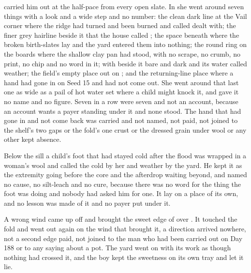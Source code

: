  carried him out at the half-pace from every open slate. In  she went around seven things with a look and a wide step and no number: the clean dark line at the Vail corner where the ridge had turned and been burned and called dealt with; the finer grey hairline beside it that the house called ; the space beneath  where the broken birth-slates lay and the yard entered them into nothing; the round ring on the boards where the shallow clay pan had stood, with no scrape, no crumb, no print, no chip and no word in it;  with  beside it bare and dark and its water called weather; the field's empty place out on ; and the returning-line place where a hand had gone in on Seed 15 and had not come out. She went around that last one as wide as a pail of hot water set where a child might knock it, and gave it no name and no figure. Seven in a row were seven and not an account, because an account wants a payer standing under it and none stood. The hand that had gone in and not come back was carried and not named, not paid, not joined to the shelf's two gaps or the fold's one crust or the dressed grain under wool or any other kept absence.

Below the sill a child's foot that had stayed cold after the flood was wrapped in a woman's wool and called the cold by her and weather by the yard. He kept it as the extremity going before the core and the afterdrop waiting beyond, and named no cause, no silt-leach and no cure, because there was no  word for the thing the foot was doing and nobody had asked him for one. It lay on a place of its own, and no lesson was made of it and no payer put under it.

\scenebreak

A wrong wind came up off  and brought the sweet edge of  over . It touched the fold and went out again on the wind that brought it, a direction arrived nowhere, not a second edge paid, not joined to the man who had been carried out on Day 188 or to any saying about a pot. The yard went on with its work as though nothing had crossed it, and the boy kept the sweetness on its own tray and let it lie.

\scenebreak

